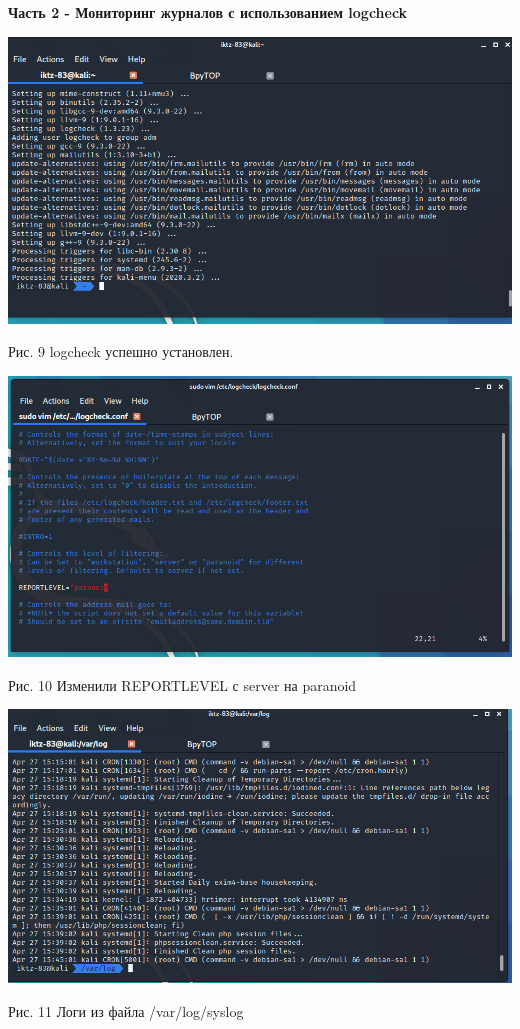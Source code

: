\documentclass[a4paper,14pt]{extarticle}
\begin{document}
    \newpage
    \textbf{Часть 2 - Мониторинг журналов с использованием logcheck}
    \begin{center}

        \includegraphics[scale=0.5]{pics/9.png}

        Рис. 9 logcheck успешно установлен. 

        \includegraphics[scale=0.5]{pics/10.png}

        Рис. 10 Изменили REPORTLEVEL с server на paranoid

        \includegraphics[scale=0.5]{pics/11.png}

        Рис. 11  Логи из файла /var/log/syslog

   \end{center}
\end{document}
